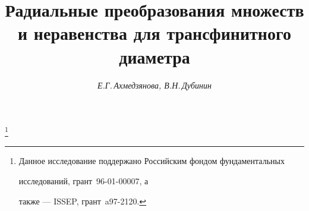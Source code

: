 









\newcommand{\mes}{\operatorname{mes}}


\newcommand{\im}{\operatorname{Im}}


\newcommand{\tts}[1]{}







 


\setcounter{page}{3}















\author{\it Е.Г.\,Ахмедзянова, В.Н.\,Дубинин}




\title{Радиальные преобразования множеств \\


и неравенства для трансфинитного диаметра}


\thanks{Данное исследование поддержано Российским фондом фундаментальных


исследований, грант \No\,96-01-00007, а


также --- ISSEP, грант \No\,a97-2120.}





\date{}




